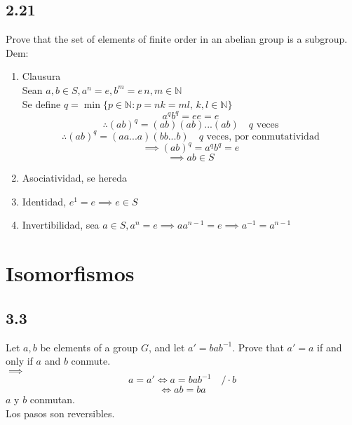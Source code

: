 \documentclass[11pt]{article}
\begin{document}
\subsection*{2.21}
Prove that the set of elements of finite order in an abelian group is a subgroup.\\
Dem:
\begin{enumerate}
	\item Clausura\\
	Sean $a,b\in S,a^n=e,b^m=e \, n,m\in\mathbb{N}$\\
	Se define $q=\min\{p\in\mathbb{N}:p=nk=ml,\, k,l\in\mathbb{N}\}$
	\[
	a^q b^q=ee=e
	\]
	\[
	\therefore (ab)^q=(ab)(ab)...(ab)\quad q\textrm{ veces}
	\]
	\[
	\therefore (ab)^q=(aa...a)(bb...b)\quad q\textrm{ veces, por conmutatividad}
	\]
	\[
	\implies (ab)^q=a^qb^q=e
	\]
	\[
	\implies ab\in S
	\]
	
	\item Asociatividad, se hereda
	
	\item Identidad, $e^1=e\implies e\in S$
	
	\item Invertibilidad, sea $a\in S, a^n=e\implies aa^{n-1}=e \implies a^{-1}=a^{n-1}$
\end{enumerate}

\section{Isomorfismos}
\subsection*{3.3}
Let $a,b$ be elements of a group $G$, and let $a'=bab^{-1}$. Prove that $a'=a$ if and only if $a$ and $b$ conmute.\\
$\implies$
\[
a=a'\iff a=bab^{-1}\quad /\cdot b
\]
\[
\iff ab=ba
\]
$a$ y $b$ conmutan.\\
Los pasos son reversibles.
\end{document}
